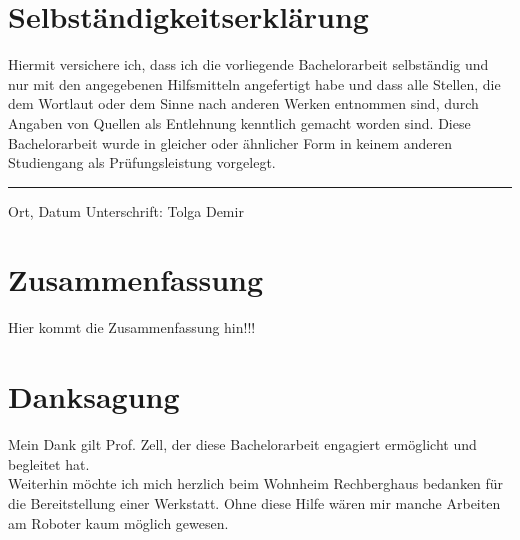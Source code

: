 \documentclass[twoside,11pt, a4paper]{report}
\begin{document}
	\thispagestyle{empty}
	
	\section*{Selbst\"andigkeitserkl\"arung}
	
	Hiermit versichere ich, dass ich die vorliegende Bachelorarbeit 
	selbst\"andig und nur mit den angegebenen Hilfsmitteln angefertigt habe und dass alle Stellen, die dem Wortlaut oder dem 
	Sinne nach anderen Werken entnommen sind, durch Angaben von Quellen als 
	Entlehnung kenntlich gemacht worden sind. 
	Diese Bachelorarbeit wurde in gleicher oder \"ahnlicher Form in keinem anderen 
	Studiengang als Pr\"ufungsleistung vorgelegt. 
	
	\vskip 3cm
	\hrule
	\vspace*{2ex}
	
	Ort, Datum	\hfill Unterschrift: Tolga Demir \hfill 
	\newpage
	
	
	\setcounter{page}{1}
	
	
	
	\section*{Zusammenfassung}
	
	Hier kommt die Zusammenfassung hin!!!
	
	\newpage
	
	\section*{Danksagung}
	Mein Dank gilt Prof. Zell, der diese Bachelorarbeit engagiert ermöglicht und begleitet hat. \\
	Weiterhin möchte ich mich herzlich beim Wohnheim Rechberghaus bedanken für die Bereitstellung einer Werkstatt. Ohne diese Hilfe wären mir manche Arbeiten am Roboter kaum möglich gewesen. 
	\cleardoublepage
	
	
\end{document}
